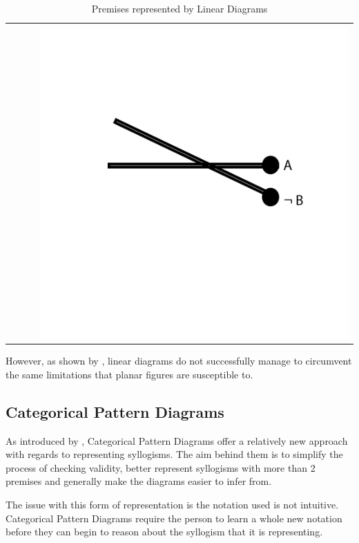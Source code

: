 \documentclass[12pt,a4paper]{report}
\begin{document}
\begin{table}[h!]
\begin{tabular}{  c  c  c  c }
\begin{minipage}{.22\textwidth}
    \end{minipage}
    \\
    &
     &
     &
    \begin{minipage}{.22\textwidth}
      \includegraphics[width=\textwidth]{O2Linear}
    \end{minipage}
    \\
  \end{tabular}
  \caption{Premises represented by Linear Diagrams}\label{tbl:linearPremises}
\end{table}
\FloatBarrier

However, as shown by \cite{lemon1998insufficiency}, linear diagrams do not successfully manage to circumvent the same limitations that planar figures are susceptible to. 

\subsection{Categorical Pattern Diagrams}
As introduced by \cite{cheng2012visualizing}, Categorical Pattern Diagrams offer a relatively new approach with regards to representing syllogisms. The aim behind them is to simplify the process of checking validity, better represent syllogisms with more than 2 premises and generally make the diagrams easier to infer from.

The issue with this form of representation is the notation used is not intuitive. Categorical Pattern Diagrams require the person to learn a whole new notation before they can begin to reason about the syllogism that it is representing.
\end{document}
